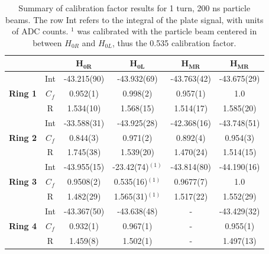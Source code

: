 \begin{table}[h]
    \centering
    \begin{tabular}{cccccc}
    \hline
                            &                & $\mathbf{H_{0R}}$         & $\mathbf{H_{0L}}$        & $\mathbf{H_{MR}}$         & $\mathbf{H_{MR}}$         \\ \hline
    \multirow{3}{*}{\textbf{Ring 1}} & Int & -43.215(90) & -43.932(69) & -43.763(42) & -43.675(29) \\
                            & $C_f$              & 0.952(1)    & 0.998(2)    & 0.957(1)    & 1.0         \\
                            & R              & 1.534(10)   & 1.568(15)   & 1.514(17)   & 1.585(20)   \\ \hline
    \multirow{3}{*}{\textbf{Ring 2}} & Int & -33.588(31) & -43.925(28) & -42.368(16) & -43.748(51) \\
                            & $C_f$              & 0.844(3)    & 0.971(2)    & 0.892(4)    & 0.954(3)    \\
                            & R              & 1.745(38)  & 1.539(20)   & 1.470(24)   & 1.514(15)   \\
                            \hline
    \multirow{3}{*}{\textbf{Ring 3}} & Int & -43.955(15) & -23.42(74)${}^{(1)}$ & -43.814(80) & -44.190(16) \\
                            & $C_f$              & 0.9508(2)   & 0.535(16)${}^{(1)}$  & 0.9677(7)   & 1.0         \\
                            & R              & 1.482(29)   & 1.565(31)${}^{(1)}$  & 1.517(22)   & 1.552(29)   \\ \hline
    \multirow{3}{*}{\textbf{Ring 4}} & Int & -43.367(50) & -43.638(48) & -           & -43.429(32) \\
                            & $C_f$             & 0.932(1)    & 0.967(1)    & -           & 0.955(1)    \\
                            & R              & 1.459(8)    & 1.502(1)    & -           & 1.497(13)   \\ \hline 
    \end{tabular}
    \caption{Summary of calibration factor results for 1 turn, 200 ns particle beams. The row Int refers to the integral of the plate signal, with units of ADC counts. ${}^{1}$ was calibrated with the particle beam centered in between $H_{0R}$ and $H_{0L}$, thus the 0.535 calibration factor. }
    \label{tab:CalFac}
\end{table}

